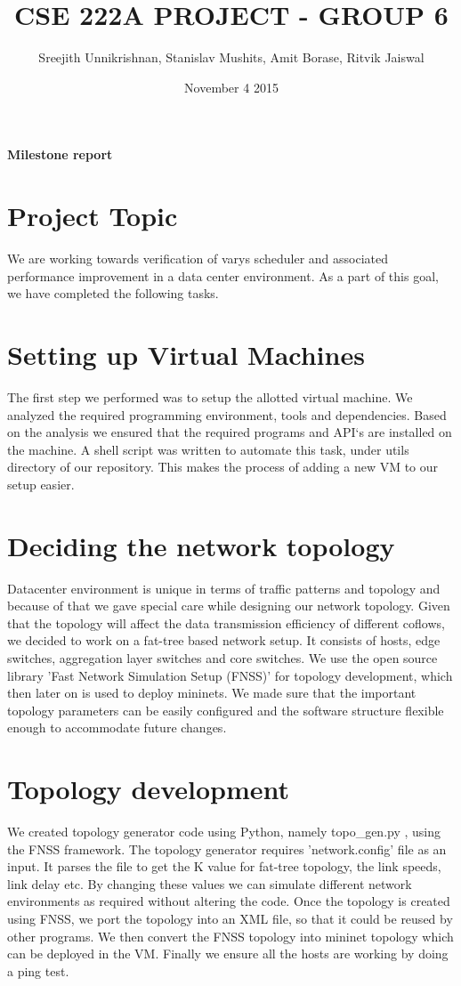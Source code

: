 \documentclass{article}
\title{CSE 222A PROJECT - GROUP 6}
\author{Sreejith Unnikrishnan, Stanislav Mushits, Amit Borase, Ritvik Jaiswal }
\date{November 4 2015}
\begin{document}
\maketitle

\begin{center}
\textbf{Milestone report}
\end{center}


\section{Project Topic}
We are working towards verification of varys scheduler\cite{varys} and associated performance improvement in a data center environment. As a part of this goal, we have completed the following tasks.

\section{Setting up Virtual Machines}
The first step we performed was to setup the allotted virtual machine. We analyzed the required programming environment, tools and dependencies. Based on the analysis we ensured that the required programs and API`s are installed on the machine. A shell script was written to automate this task, under utils directory of our repository. This makes the process of adding a new VM to our setup easier.

\section{Deciding the network topology}
Datacenter environment is unique in terms of traffic patterns and topology and because of that we gave special care while designing our network topology. Given that the topology will affect the data transmission efficiency of different coflows, we decided to work on a fat-tree based network setup. It consists of hosts, edge switches, aggregation layer switches and core switches. We use the open source library 'Fast Network Simulation Setup (FNSS)' \cite{fnss} for topology development, which then later on is used to deploy mininets. We made sure that the important topology parameters can be easily configured and the software structure flexible enough to accommodate future changes.

\section{Topology development}
We created topology generator code using Python, namely topo\_gen.py \cite{repo}, using the FNSS framework. The topology generator requires 'network.config' file as an input. It parses the file to get the K value for fat-tree topology, the link speeds, link delay etc. By changing these values we can simulate different network environments as required without altering the code. Once the topology is created using FNSS, we port the topology into an XML file, so that it could be reused by other programs. We then convert the FNSS topology into mininet topology which can be deployed in the VM. Finally we ensure all the hosts are working by doing a ping test.
\end{document}
